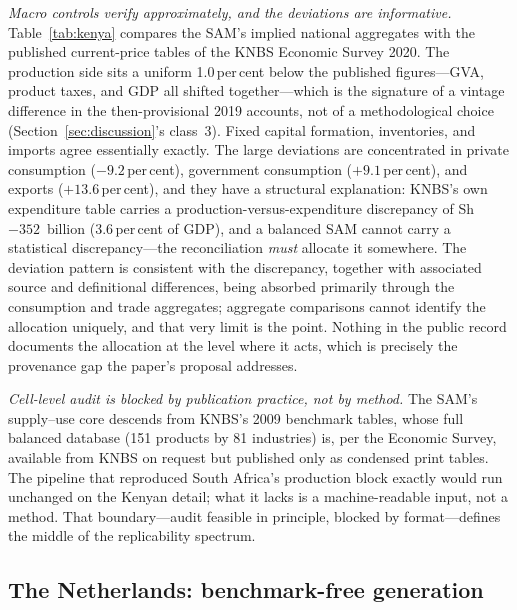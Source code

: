 \emph{Macro controls verify approximately, and the deviations are
informative.} Table~\ref{tab:kenya} compares the SAM's implied national
aggregates with the published current-price tables of the KNBS Economic
Survey 2020. The production side sits a uniform 1.0\,per\,cent below the
published figures---GVA, product taxes, and GDP all shifted
together---which is the signature of a vintage difference in the
then-provisional 2019 accounts, not of a methodological choice
(Section~\ref{sec:discussion}'s class~3). Fixed capital formation,
inventories, and imports agree essentially exactly. The large deviations
are concentrated in private consumption ($-9.2$\,per\,cent), government
consumption ($+9.1$\,per\,cent), and exports ($+13.6$\,per\,cent), and
they have a structural explanation: KNBS's own expenditure table carries a
production-versus-expenditure discrepancy of Sh~$-352$~billion
(3.6\,per\,cent of GDP), and a balanced SAM cannot carry a statistical
discrepancy---the reconciliation \emph{must} allocate it somewhere. The
deviation pattern is consistent with the discrepancy, together with
associated source and definitional differences, being absorbed primarily
through the consumption and trade aggregates; aggregate comparisons
cannot identify the allocation uniquely, and that very limit is the
point. Nothing in the public record documents the allocation at the
level where it acts, which is precisely the provenance gap the paper's
proposal addresses.

\begin{table}[t]
\centering\small
\caption{Kenya: the IFPRI 2019 Nexus SAM against published KNBS controls
(Sh billion, current prices; Economic Survey 2020, Tables 2.1 and 2.7,
2019 provisional).}
\label{tab:kenya}

\end{table}

\emph{Cell-level audit is blocked by publication practice, not by
method.} The SAM's supply--use core descends from KNBS's 2009 benchmark
tables, whose full balanced database (151 products by 81 industries) is,
per the Economic Survey, available from KNBS on request but published only
as condensed print tables. The pipeline that reproduced South Africa's
production block exactly would run unchanged on the Kenyan detail; what it
lacks is a machine-readable input, not a method. That boundary---audit
feasible in principle, blocked by format---defines the middle of the
replicability spectrum.

\subsection{The Netherlands: benchmark-free generation}
\label{sec:applications:nl}

